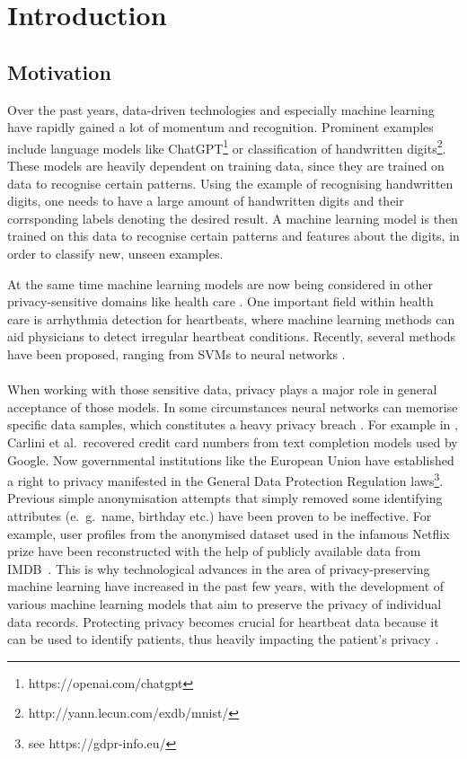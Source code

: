 \section{Introduction}

\subsection{Motivation}
Over the past years, data-driven technologies and especially machine learning have rapidly gained a lot of momentum and recognition. Prominent examples include language models like ChatGPT\footnote{https://openai.com/chatgpt} or classification of handwritten digits\footnote{http://yann.lecun.com/exdb/mnist/}. These models are heavily dependent on training data, since they are trained on data to recognise certain patterns. Using the example of recognising handwritten digits, one needs to have a large amount of handwritten digits and their corrsponding labels denoting the desired result. A machine learning model is then trained on this data to recognise certain patterns and features about the digits, in order to classify new, unseen examples.


At the same time machine learning models are now being considered in other privacy-sensitive domains like health care \parencite[see][]{ai_and_med,aimed2,aimed3,aimed4}. One important field within health care is arrhythmia detection for heartbeats, where machine learning methods can aid physicians to detect irregular heartbeat conditions. Recently, several methods have been proposed, ranging from SVMs to neural networks \parencite[see review][]{arr_rev}.

\paragraph{}
When working with those sensitive data, privacy plays a major role in general acceptance of those models. In some circumstances neural networks can memorise specific data samples, which constitutes a heavy privacy breach \Parencite[see][]{feldman2021does}. For example in \Parencite{carlini19}, Carlini et al.\ recovered credit card numbers from text completion models used by Google. Now governmental institutions like the European Union have established a right to privacy manifested in the General Data Protection Regulation laws\footnote[1]{see https://gdpr-info.eu/}. Previous simple anonymisation attempts that simply removed some identifying attributes (e.\ g.\ name, birthday etc.) have been proven to be ineffective. For example, user profiles from the anonymised dataset used in the infamous Netflix prize have been reconstructed with the help of publicly available data from IMDB~\cite{4531148}. This is why technological advances in the area of privacy-preserving machine learning have increased in the past few years, with the development of various machine learning models that aim to preserve the privacy of individual data records. Protecting privacy becomes crucial for heartbeat data because it can be used to identify patients, thus heavily impacting the patient's privacy \parencite[see heartbeat biometrics][]{heartb_auth,hegde2011heartbeat}.

